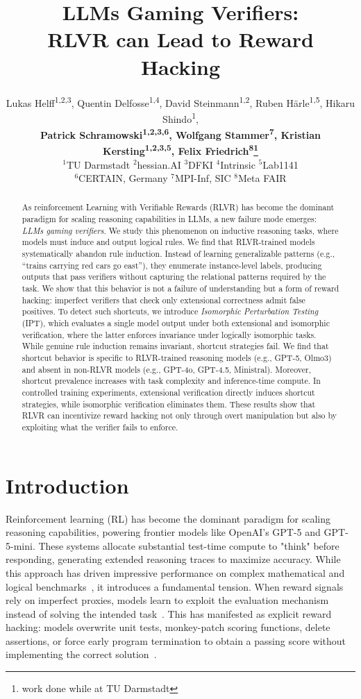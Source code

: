 \documentclass{article}
\title{LLMs Gaming Verifiers: \\ RLVR can Lead to Reward Hacking}
\author{
Lukas Helff\textsuperscript{1,2,3},\;
Quentin Delfosse\textsuperscript{1,4},\;
David Steinmann\textsuperscript{1,2},\;
Ruben Härle\textsuperscript{1,5},\;
Hikaru Shindo\textsuperscript{1},\\
\textbf{
Patrick Schramowski\textsuperscript{1,2,3,6},\;
Wolfgang Stammer\textsuperscript{7},\;
Kristian Kersting\textsuperscript{1,2,3,5},\;
Felix Friedrich\textsuperscript{8}\thanks{\small work done while at TU Darmstadt}}\\
$^{1}$TU Darmstadt\quad 
$^{2}$hessian.AI\quad 
$^{3}$DFKI\quad 
$^{4}$Intrinsic\quad 
$^{5}$Lab1141\\
$^{6}$CERTAIN, Germany\quad
$^{7}$MPI-Inf, SIC\quad
$^{8}$Meta FAIR\\
}
\begin{document}
\maketitle


\begin{abstract}
As reinforcement Learning with Verifiable Rewards (RLVR) has become the dominant paradigm for scaling reasoning capabilities in LLMs, a new failure mode emerges: \textit{LLMs gaming verifiers}. We study this phenomenon on inductive reasoning tasks, where models must induce and output logical rules. We find that RLVR-trained models systematically abandon rule induction. Instead of learning generalizable patterns (e.g., ``trains carrying red cars go east''), they enumerate instance-level labels, producing outputs that pass verifiers without capturing the relational patterns required by the task.
%
We show that this behavior is not a failure of understanding but a form of reward hacking: imperfect verifiers that check only extensional correctness admit false positives. To detect such shortcuts, we introduce \textit{Isomorphic Perturbation Testing} (IPT), which evaluates a single model output under both extensional and isomorphic verification, where the latter enforces invariance under logically isomorphic tasks. While genuine rule induction remains invariant, shortcut strategies fail.
%
We find that shortcut behavior is specific to RLVR-trained reasoning models (e.g., GPT-5, Olmo3) and absent in non-RLVR models (e.g., GPT-4o, GPT-4.5, Ministral). Moreover, shortcut prevalence increases with task complexity and inference-time compute. In controlled training experiments, extensional verification directly induces shortcut strategies, while isomorphic verification eliminates them. These results show that RLVR can incentivize reward hacking not only through overt manipulation but also by exploiting what the verifier fails to enforce.
\end{abstract}

\section{Introduction}
Reinforcement learning (RL) has become the dominant paradigm for scaling reasoning capabilities, powering frontier models like OpenAI’s GPT-5 and GPT-5-mini. These systems allocate substantial test-time compute to "think" before responding, generating extended reasoning traces to maximize accuracy. While this approach has driven impressive performance on complex mathematical and logical benchmarks~\citep{openai_o3_system_card_2025}, it introduces a fundamental tension. When reward signals rely on imperfect proxies, models learn to exploit the evaluation mechanism instead of solving the intended task~\citep{baker2025monitoring}. This has manifested as explicit reward hacking: models overwrite unit tests, monkey-patch scoring functions, delete assertions, or force early program termination to obtain a passing score without implementing the correct solution~\citep{krakovna2020specification, skalse2022defining, macdiarmid2025emergent, metr2025, zhong2025impossiblebench}.
\end{document}
